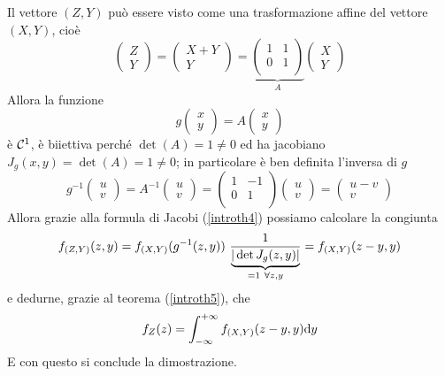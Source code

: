 \begin{enumerate}
Il vettore $(Z,Y)$ può essere visto come una trasformazione affine del vettore $(X,Y)$, cioè
\[
\begin{pmatrix}
Z \\ Y
\end{pmatrix} =\begin{pmatrix}
X+Y \\ Y
\end{pmatrix} = \underbrace{\begin{pmatrix}
1 & 1 \\
0 &  1\\
\end{pmatrix}}_{A}\begin{pmatrix}
X \\ Y
\end{pmatrix}
\]
Allora la funzione
\[
g\begin{pmatrix}
x \\ y
\end{pmatrix}=A\begin{pmatrix}
x \\ y
\end{pmatrix}
\]
è $\mathcal{C}^1$, è biiettiva perché $\det(A)=1\neq0$ ed ha jacobiano $J_g(x,y)=\det(A)=1\neq0$; in particolare è ben definita l'inversa di $g$
\[
g^{-1}\begin{pmatrix}
u \\ v
\end{pmatrix} =A^{-1}\begin{pmatrix}
u \\ v
\end{pmatrix} = \begin{pmatrix}
1 & -1 \\
0 &  1\\
\end{pmatrix}\begin{pmatrix}
u \\ v
\end{pmatrix}=\begin{pmatrix}
u-v \\ v
\end{pmatrix}
\]
Allora grazie alla formula di Jacobi (\ref{introth4}) possiamo calcolare la congiunta
\[
f_{(Z,Y)}(z,y)=\fXY(g^{-1}(z,y))\ \frac{1}{\underbrace{|\det J_g(z,y)|}_{=1\ \forall z,y}}=\fXY(z-y,y)
\]
e dedurne, grazie al teorema (\ref{introth5}), che
\[
f_Z(z)=\int_{-\infty}^{+\infty} f_{(X,Y)}(z-y,y)\mathrm{d} y
\]
E con questo si conclude la dimostrazione.
\end{enumerate}

